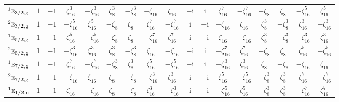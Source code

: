 \documentclass[10pt,a4paper]{article}
\numberwithin{equation}{section}
\newcommand{\irr}[1]{\text{\normalfont\scshape #1}}
\newcommand{\conjpair}[1]{{}^{#1}}
\newcommand{\ptag}[1]{\mathrm{#1}}
\newcommand{\iunit}{\mathrm{i}}
\newcommand{\rootunity}[1]{\zeta_{#1}}
\begin{document}
{\begin{longtable}{@{}lcccccccccccccccc@{}}
$\conjpair{1}\irr{e}_{3/2,\ptag{g}}$ & $1$ & $-1$ & $\rootunity{16}^{3}$ & $-\rootunity{16}^{3}$ & $\rootunity{8}^{3}$ & $-\rootunity{8}^{3}$ & $-\rootunity{16}$ & $\rootunity{16}$ & $-\iunit{}$ & $\iunit{}$ & $\rootunity{16}^{7}$ & $-\rootunity{16}^{7}$ & $-\rootunity{8}$ & $\rootunity{8}$ & $-\rootunity{16}^{5}$ & $\rootunity{16}^{5}$\\
$\conjpair{2}\irr{e}_{3/2,\ptag{g}}$ & $1$ & $-1$ & $-\rootunity{16}^{5}$ & $\rootunity{16}^{5}$ & $-\rootunity{8}$ & $\rootunity{8}$ & $\rootunity{16}^{7}$ & $-\rootunity{16}^{7}$ & $\iunit{}$ & $-\iunit{}$ & $-\rootunity{16}$ & $\rootunity{16}$ & $\rootunity{8}^{3}$ & $-\rootunity{8}^{3}$ & $\rootunity{16}^{3}$ & $-\rootunity{16}^{3}$\\
$\conjpair{1}\irr{e}_{5/2,\ptag{g}}$ & $1$ & $-1$ & $\rootunity{16}^{5}$ & $-\rootunity{16}^{5}$ & $-\rootunity{8}$ & $\rootunity{8}$ & $-\rootunity{16}^{7}$ & $\rootunity{16}^{7}$ & $\iunit{}$ & $-\iunit{}$ & $\rootunity{16}$ & $-\rootunity{16}$ & $\rootunity{8}^{3}$ & $-\rootunity{8}^{3}$ & $-\rootunity{16}^{3}$ & $\rootunity{16}^{3}$\\
$\conjpair{2}\irr{e}_{5/2,\ptag{g}}$ & $1$ & $-1$ & $-\rootunity{16}^{3}$ & $\rootunity{16}^{3}$ & $\rootunity{8}^{3}$ & $-\rootunity{8}^{3}$ & $\rootunity{16}$ & $-\rootunity{16}$ & $-\iunit{}$ & $\iunit{}$ & $-\rootunity{16}^{7}$ & $\rootunity{16}^{7}$ & $-\rootunity{8}$ & $\rootunity{8}$ & $\rootunity{16}^{5}$ & $-\rootunity{16}^{5}$\\
$\conjpair{1}\irr{e}_{7/2,\ptag{g}}$ & $1$ & $-1$ & $\rootunity{16}^{7}$ & $-\rootunity{16}^{7}$ & $-\rootunity{8}^{3}$ & $\rootunity{8}^{3}$ & $\rootunity{16}^{5}$ & $-\rootunity{16}^{5}$ & $-\iunit{}$ & $\iunit{}$ & $-\rootunity{16}^{3}$ & $\rootunity{16}^{3}$ & $\rootunity{8}$ & $-\rootunity{8}$ & $-\rootunity{16}$ & $\rootunity{16}$\\
$\conjpair{2}\irr{e}_{7/2,\ptag{g}}$ & $1$ & $-1$ & $-\rootunity{16}$ & $\rootunity{16}$ & $\rootunity{8}$ & $-\rootunity{8}$ & $-\rootunity{16}^{3}$ & $\rootunity{16}^{3}$ & $\iunit{}$ & $-\iunit{}$ & $\rootunity{16}^{5}$ & $-\rootunity{16}^{5}$ & $-\rootunity{8}^{3}$ & $\rootunity{8}^{3}$ & $\rootunity{16}^{7}$ & $-\rootunity{16}^{7}$\\
$\conjpair{1}\irr{e}_{1/2,\ptag{u}}$ & $1$ & $-1$ & $\rootunity{16}$ & $-\rootunity{16}$ & $\rootunity{8}$ & $-\rootunity{8}$ & $\rootunity{16}^{3}$ & $-\rootunity{16}^{3}$ & $\iunit{}$ & $-\iunit{}$ & $-\rootunity{16}^{5}$ & $\rootunity{16}^{5}$ & $-\rootunity{8}^{3}$ & $\rootunity{8}^{3}$ & $-\rootunity{16}^{7}$ & $\rootunity{16}^{7}$\\

\end{longtable}}
\end{document}
